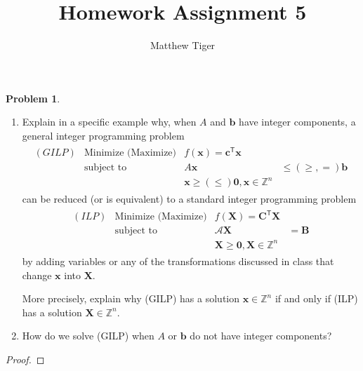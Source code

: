 \documentclass[12pt]{article}
\title{Homework Assignment 5}
\author{Matthew Tiger}
\theoremstyle{definition}
\newtheorem{problem}{Problem}
\newcommand{\vc}[1]{\boldsymbol{#1}}
\newcommand{\tran}{\mathsf{T}}
\begin{document}
\maketitle


\begin{problem}
  \begin{enumerate}
    \item Explain in a specific example why, when $A$ and $\vc{b}$ have integer
      components, a general integer programming problem
      \begin{align*}
        \begin{array}{rlrl}
          (GILP) & \text{Minimize (Maximize)} & f(\vc{x}) = \vc{c}^\tran \vc{x} & \\
          & \text{subject to} & A\vc{x} &\leq (\geq, =) \vc{b} \\
          & & \vc{x} \geq (\leq) \vc{0}, \vc{x}\in\mathbb{Z}^n
        \end{array}
      \end{align*}
      can be reduced (or is equivalent) to a standard integer programming problem
      \begin{align*}
        \begin{array}{rlrl}
          (ILP) & \text{Minimize (Maximize)} & f(\vc{X}) = \vc{C}^\tran\vc{X}& \\
          & \text{subject to} & \mathscr{A}\vc{X} &= \vc{B} \\
          && \vc{X} \geq \vc{0}, \vc{X} \in \mathbb{Z}^n
        \end{array}
      \end{align*}
      by adding variables or any of the transformations discussed in class that change $\vc{x}$ into $\vc{X}$.

      More precisely, explain why (GILP) has a solution $\vc{x} \in \mathbb{Z}^n$ if and only if
      (ILP) has a solution $\vc{X} \in \mathbb{Z}^n$.
    \item How do we solve (GILP) when $A$ or $\vc{b}$ do not have integer components?
  \end{enumerate}
\end{problem}

\begin{proof}
\end{proof}
\newpage
\end{document}
